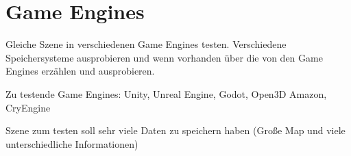 \chapter{Game Engines}\label{ch:gameengines}

Gleiche Szene in verschiedenen Game Engines testen. 
Verschiedene Speichersysteme ausprobieren und wenn vorhanden über die von den Game Engines erzählen und ausprobieren.

Zu testende Game Engines: Unity, Unreal Engine, Godot, Open3D Amazon, CryEngine

Szene zum testen soll sehr viele Daten zu speichern haben (Große Map und viele unterschiedliche Informationen)